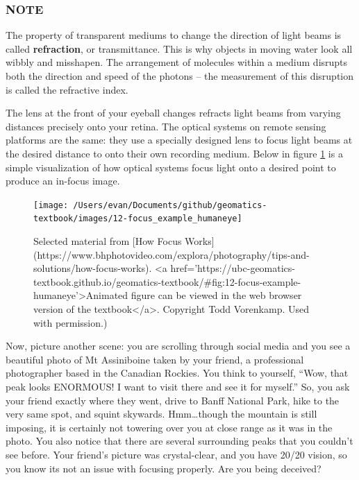 \documentclass[
]{book}
\begin{document}
\hypertarget{note-1}{%
\subsubsection*{NOTE}\label{note-1}}

The property of transparent mediums to change the direction of light beams is called \textbf{refraction}, or transmittance. This is why objects in moving water look all wibbly and misshapen. The arrangement of molecules within a medium disrupts both the direction and speed of the photons -- the measurement of this disruption is called the refractive index.

The lens at the front of your eyeball changes refracts light beams from varying distances precisely onto your retina. The optical systems on remote sensing platforms are the same: they use a specially designed lens to focus light beams at the desired distance to onto their own recording medium. Below in figure \ref{fig:12-focus-example-humaneye} is a simple visualization of how optical systems focus light onto a desired point to produce an in-focus image.

\begin{figure}
\texttt{[image: /Users/evan/Documents/github/geomatics-textbook/images/12-focus\_example\_humaneye]} \caption{Selected material from [How Focus Works](https://www.bhphotovideo.com/explora/photography/tips-and-solutions/how-focus-works). <a href='https://ubc-geomatics-textbook.github.io/geomatics-textbook/#fig:12-focus-example-humaneye'>Animated figure can be viewed in the web browser version of the textbook</a>. Copyright Todd Vorenkamp. Used with permission.)}\label{fig:12-focus-example-humaneye}
\end{figure}

Now, picture another scene: you are scrolling through social media and you see a beautiful photo of Mt Assiniboine taken by your friend, a professional photographer based in the Canadian Rockies. You think to yourself, ``Wow, that peak looks ENORMOUS! I want to visit there and see it for myself.'' So, you ask your friend exactly where they went, drive to Banff National Park, hike to the very same spot, and squint skywards. Hmm\ldots though the mountain is still imposing, it is certainly not towering over you at close range as it was in the photo. You also notice that there are several surrounding peaks that you couldn't see before. Your friend's picture was crystal-clear, and you have 20/20 vision, so you know its not an issue with focusing properly. Are you being deceived?
\end{document}
